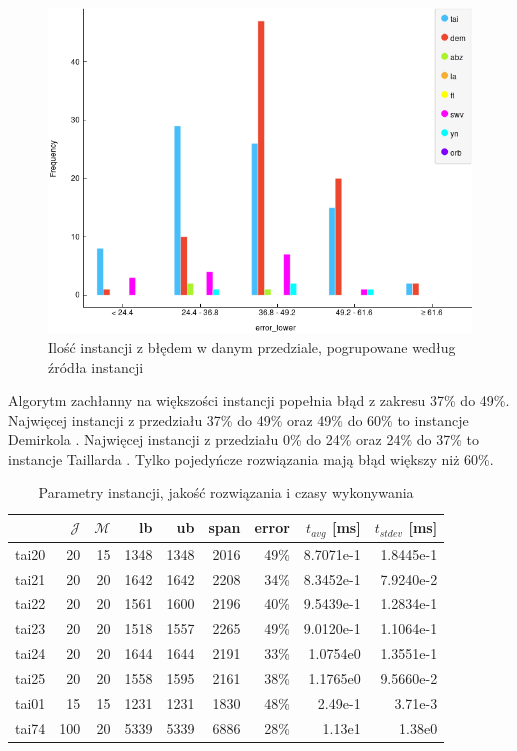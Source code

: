 \documentclass[11pt,twocolumn]{article}
\begin{document}
\begin{figure}[h!]
	\includegraphics[width=\linewidth]{err_dist.png}
	\caption{Ilość instancji z błędem w danym przedziale, pogrupowane według źródła instancji \label{err_dist}}
\end{figure}

Algorytm zachłanny na większości instancji popełnia błąd z zakresu 37\% do 49\%.
Najwięcej instancji z przedziału 37\% do 49\% oraz 49\% do 60\% to instancje Demirkola \cite{dem}.
Najwięcej instancji z przedziału 0\% do 24\% oraz 24\% do 37\% to instancje Taillarda \cite{tai}.
Tylko pojedyńcze rozwiązania mają błąd większy niż 60\%.


\begin{table}[b]
\centering
\begin{tabular}{l|rrrrrrrr}
    & $\mathcal{J}$ & $\mathcal{M}$ & lb  & ub   & span & error & $t_{avg}$ [ms] & $t_{stdev}$ [ms] \\ \hline
    tai20 & 20  & 15 & 1348 & 1348 & 2016 & 49\% & 8.7071e-1 & 1.8445e-1 \\
    tai21 & 20  & 20 & 1642 & 1642 & 2208 & 34\% & 8.3452e-1 & 7.9240e-2 \\
    tai22 & 20  & 20 & 1561 & 1600 & 2196 & 40\% & 9.5439e-1 & 1.2834e-1 \\
    tai23 & 20  & 20 & 1518 & 1557 & 2265 & 49\% & 9.0120e-1 & 1.1064e-1 \\
    tai24 & 20  & 20 & 1644 & 1644 & 2191 & 33\% & 1.0754e0 & 1.3551e-1 \\
    tai25 & 20  & 20 & 1558 & 1595 & 2161 & 38\% & 1.1765e0 & 9.5660e-2 \\ \hline
    tai01 & 15  & 15 & 1231 & 1231 & 1830 & 48\% & 2.49e-1 & 3.71e-3 \\
    tai74 & 100 & 20 & 5339 & 5339 & 6886 & 28\% & 1.13e1 & 1.38e0 \\
\end{tabular}
\caption{Parametry instancji, jakość rozwiązania i czasy wykonywania}
\label{tab1}
\end{table}
\end{document}
